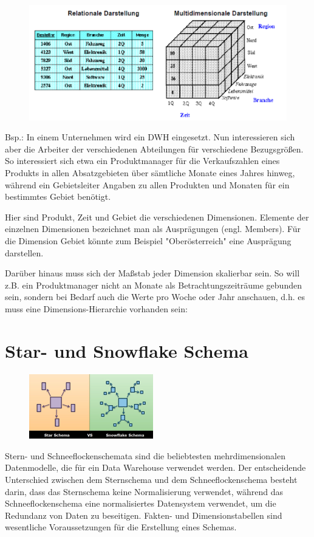 \begin{figure}[H]
    \centering
    \includegraphics[width=.5\textwidth]{Content/images/dwh/multi.png}
    \caption{}
    \label{fig:dwh:multi}
\end{figure}

Bsp.:
In einem Unternehmen wird ein DWH eingesetzt. Nun interessieren sich aber die Arbeiter der verschiedenen Abteilungen für verschiedene Bezugsgrößen.
So interessiert sich etwa ein Produktmanager für die Verkaufszahlen eines Produkts in allen Absatzgebieten über sämtliche Monate eines Jahres hinweg, während ein Gebietsleiter Angaben zu allen Produkten und Monaten für ein bestimmtes Gebiet benötigt.

Hier sind Produkt, Zeit und Gebiet die verschiedenen Dimensionen. Elemente der einzelnen Dimensionen bezeichnet man als Ausprägungen (engl. Members). Für die Dimension Gebiet könnte zum Beispiel "Oberösterreich" eine Ausprägung darstellen.

Darüber hinaus muss sich der Maßstab jeder Dimension skalierbar sein. So will z.B. ein Produktmanager nicht an Monate als Betrachtungszeiträume gebunden sein, sondern bei Bedarf auch die Werte pro Woche oder Jahr anschauen, d.h. es muss eine Dimensions-Hierarchie vorhanden sein:

\section{Star- und Snowflake Schema}

\begin{figure}
    \begin{center}
      \includegraphics[width=0.48\textwidth]{Content/images/dwh/starsnow.png}
    \end{center}
    \caption{}
  \end{figure}
  Stern- und Schneeflockenschemata sind die beliebtesten mehrdimensionalen Datenmodelle, die für ein Data Warehouse verwendet werden. Der entscheidende Unterschied zwischen dem Sternschema und dem Schneeflockenschema besteht darin, dass das Sternschema keine Normalisierung verwendet, während das Schneeflockenschema eine normalisiertes Datensystem verwendet, um die Redundanz von Daten zu beseitigen. Fakten- und Dimensionstabellen sind wesentliche Voraussetzungen für die Erstellung eines Schemas.

